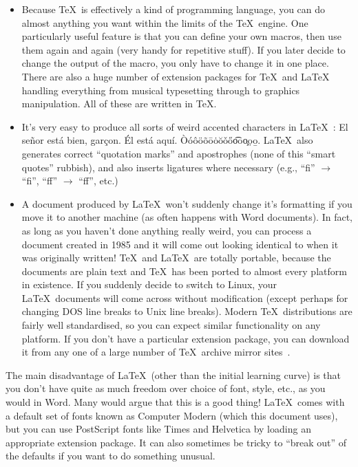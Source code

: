 \documentclass[12pt,a4paper,pdftex]{article}
\begin{document}
\begin{itemize}
	\item Because \TeX\ is effectively a kind of programming language,
	you can do almost anything you want within the limits of the \TeX\
	engine. One particularly useful feature is that you can define your
	own macros, then use them again and again (very handy for repetitive
	stuff). If you later decide to change the output of the macro, you
	only have to change it in one place. There are also a huge number of
	extension packages for \TeX\ and \LaTeX\, handling everything from
	musical typesetting through to graphics manipulation. All of these
	are written in \TeX.
	
	\item It's very easy to produce all sorts of weird accented
	characters in \LaTeX~\cite{UsersGuide}: El se\~{n}or est\'{a} bien,
	gar\c{c}on. \'{E}l est\'{a} aqu\'{i}.
	\`{O}\'{o}\^{o}\"{o}\~{o}\={o}\.{o}\u{o}\v{o}\H{o}\t{oo}\c{o}\d{o}\b{o}.
	\LaTeX\ also generates correct ``quotation marks'' and apostrophes
	(none of this ``smart quotes'' rubbish), and also inserts ligatures
	where necessary (e.g., ``f{}i'' \(\rightarrow\) ``fi'', ``f{}f''
	\(\rightarrow\) ``ff'', etc.)

	\item A document produced by \LaTeX\ won't suddenly change it's
	formatting if you move it to another machine (as often happens with
	Word documents). In fact, as long as you haven't done anything
	really weird, you can process a document created in 1985 and it will
	come out looking identical to when it was originally written! \TeX\
	and \LaTeX\ are totally portable, because the documents are plain
	text and \TeX\ has been ported to almost every platform in
	existence. If you suddenly decide to switch to Linux, your \LaTeX\
	documents will come across without modification (except perhaps for
	changing DOS line breaks to Unix line breaks). Modern \TeX\
	distributions are fairly well standardised, so you can expect
	similar functionality on any platform. If you don't have a
	particular extension package, you can download it from any one of a
	large number of \TeX\ archive mirror sites~\cite{CTAN}.

\end{itemize}

The main disadvantage of \LaTeX\ (other than the initial learning curve)
is that you don't have quite as much freedom over choice of font, style,
etc., as you would in Word. Many would argue that this is a good thing!
\LaTeX\ comes with a default set of fonts known as Computer Modern
(which this document uses), but you can use PostScript fonts like
{\fontfamily{ptm}\selectfont Times} and {\fontfamily{phv}\selectfont
Helvetica} by loading an appropriate extension package. It can also
sometimes be tricky to ``break out'' of the defaults if you want to do
something unusual.
\end{document}
